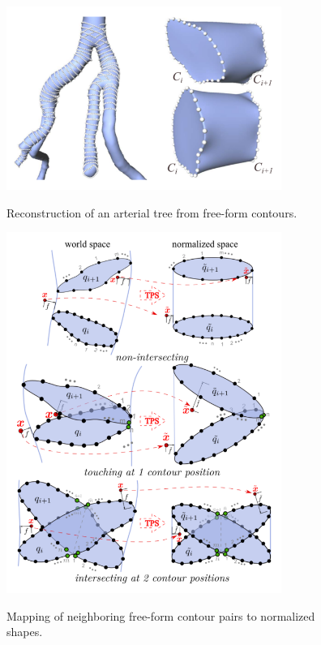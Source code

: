 \begin{figure}[h]
	\centering
	\includegraphics[width=0.8\textwidth]{./Images/ReconstructionFreeFormContours.png} \\
	\caption{Reconstruction of an arterial tree from free-form contours.}
	\cite{kretschmer2012reliable}
	\label{fig:ReconstructionFreeFormContours}
\end{figure} 

\begin{figure}[h]
	\centering
	\includegraphics[width=0.8\textwidth]{./Images/IntersectingContours.png} \\
	\caption{Mapping of neighboring free-form contour pairs to normalized shapes.}
	\cite{kretschmer2012reliable}
	\label{fig:IntersectingContours}
\end{figure} 

